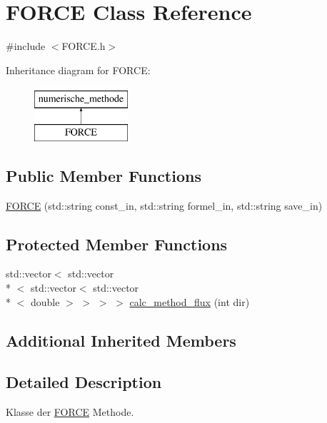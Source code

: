 \hypertarget{classFORCE}{\section{F\-O\-R\-C\-E Class Reference}
\label{classFORCE}
}


{\ttfamily \#include $<$F\-O\-R\-C\-E.\-h$>$}

Inheritance diagram for F\-O\-R\-C\-E\-:\begin{figure}[H]
\begin{center}
\leavevmode
\includegraphics[height=2.000000cm]{classFORCE}
\end{center}
\end{figure}
\subsection*{Public Member Functions}
\begin{DoxyCompactItemize}
\item 
\hyperlink{classFORCE_a0dd4dcc9d89eb274f2f8ded4b3f48f89}{F\-O\-R\-C\-E} (std\-::string const\-\_\-in, std\-::string formel\-\_\-in, std\-::string save\-\_\-in)
\end{DoxyCompactItemize}
\subsection*{Protected Member Functions}
\begin{DoxyCompactItemize}
\item 
std\-::vector$<$ std\-::vector\\*
$<$ std\-::vector$<$ std\-::vector\\*
$<$ double $>$ $>$ $>$ $>$ \hyperlink{classFORCE_a03c0c50dc6e49e1d1b1f056cb76742e9}{calc\-\_\-method\-\_\-flux} (int dir)
\end{DoxyCompactItemize}
\subsection*{Additional Inherited Members}


\subsection{Detailed Description}
Klasse der \hyperlink{classFORCE}{F\-O\-R\-C\-E} Methode. 

